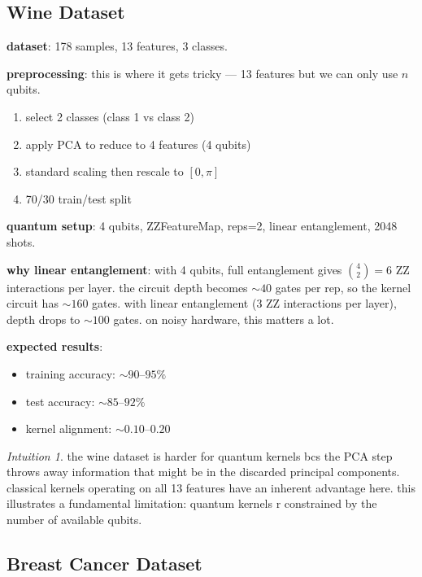 \documentclass[11pt,a4paper]{article}
\theoremstyle{definition}
\theoremstyle{remark}
\newtheorem*{intuition}{Intuition}
\begin{document}
\subsection{Wine Dataset}

\textbf{dataset}: 178 samples, 13 features, 3 classes.

\textbf{preprocessing}: this is where it gets tricky --- 13 features but we can only use $n$ qubits.
\begin{enumerate}[leftmargin=*]
    \item select 2 classes (class 1 vs class 2)
    \item apply PCA to reduce to 4 features (4 qubits)
    \item standard scaling then rescale to $[0, \pi]$
    \item 70/30 train/test split
\end{enumerate}

\textbf{quantum setup}: 4 qubits, ZZFeatureMap, reps=2, linear entanglement, 2048 shots.

\textbf{why linear entanglement}: with 4 qubits, full entanglement gives $\binom{4}{2} = 6$ ZZ interactions per layer. the circuit depth becomes $\sim 40$ gates per rep, so the kernel circuit has $\sim 160$ gates. with linear entanglement (3 ZZ interactions per layer), depth drops to $\sim 100$ gates. on noisy hardware, this matters a lot.

\textbf{expected results}:
\begin{itemize}[leftmargin=*]
    \item training accuracy: $\sim 90$--$95\%$
    \item test accuracy: $\sim 85$--$92\%$
    \item kernel alignment: $\sim 0.10$--$0.20$
\end{itemize}

\begin{intuition}
the wine dataset is harder for quantum kernels bcs the PCA step throws away information that might be in the discarded principal components. classical kernels operating on all 13 features have an inherent advantage here. this illustrates a fundamental limitation: quantum kernels r constrained by the number of available qubits.
\end{intuition}

\subsection{Breast Cancer Dataset}
\end{document}

